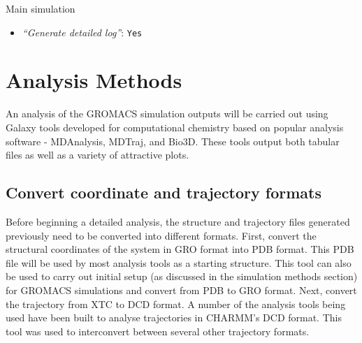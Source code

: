 \documentclass[twocolumn]{bmcart}%
\providecommand{\tightlist}{%
  \setlength{\itemsep}{0pt}\setlength{\parskip}{0pt}}
\begin{document}
\begin{handson_box_colour}{Main simulation}
\begin{itemize}
\begin{itemize}
      \begin{itemize}
      \tightlist
      \item
        \emph{``Temperature /K''}: \texttt{300}
      \item
        \emph{``Step length in ps''}: \texttt{0.001}
      \item
        \emph{``Number of steps that elapse between saving data points
        (velocities, forces, energies)''}: \texttt{1000}
      \item
        \emph{``Number of steps for the simulation''}: \texttt{1000000}
      \end{itemize}
    \end{itemize}
  \item
    \emph{``Generate detailed log''}: \texttt{Yes}
  \end{itemize}

\end{handson_box_colour}


\hypertarget{analysis}{%
\section*{Analysis Methods}\label{analysis}}

An analysis of the GROMACS simulation outputs will be carried out using Galaxy tools developed for computational chemistry\cite{senapathi_biomolecular_2019} based on popular analysis software - MDAnalysis\cite{michaudagrawal_mdanalysis_2011}, MDTraj\cite{mcgibbon_mdtraj_2015}, and  Bio3D\cite{skjaerven_integrating_2014}. These tools output both tabular files as well as a variety of attractive plots.



\hypertarget{create-pdb-file-needed-by-most-analysis-tools}{%
\subsection*{Convert coordinate and trajectory formats}\label{create-pdb-file-needed-by-most-analysis-tools}}

Before beginning a detailed analysis, the structure and trajectory files generated previously need to be converted into different formats. First, convert the structural coordinates of the system in GRO format into PDB format. This PDB file will be used by most analysis tools as a starting structure. This tool can also be used to carry out initial setup (as discussed in the simulation methods section) for GROMACS simulations and convert from PDB to GRO format. Next, convert the trajectory from XTC to DCD format. A number of the analysis tools being used have been built to analyse trajectories in CHARMM's DCD format. This tool was used to interconvert between several other trajectory formats. 
\end{document}
